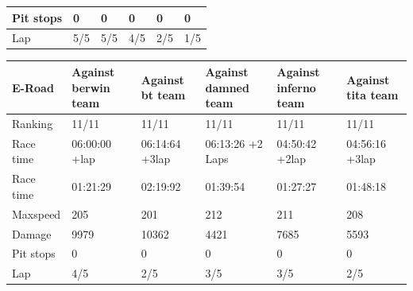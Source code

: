 \documentclass{llncs}
\begin{document}
\begin{table}[h!]
\begin{tabular}{ |p{3cm}|p{2cm}|p{2cm}|p{2 cm}|p{2 cm}|p{2 cm}|}
		
		Pit stops & 0 & 0 & 0 & 0& 0
		\\
		\hline 	
		Lap & 5/5  & 5/5 & 4/5 & 2/5 & 1/5
		\\ 
		\hline
	\end{tabular} 
	
	\begin{tabular}{ |p{3cm}|p{2cm}|p{2cm}|p{2 cm}|p{2 cm}|p{ 2 cm}|}
		\hline
		{ \color{blue}\textbf{E-Road} }&
		{ \color{red}\textbf{Against berwin team }}&  
		{ \color{red} \textbf{Against bt team} } &
		{ \color{red} \textbf{Against damned team} } &
		{ \color{red} \textbf{Against inferno team} }&
		{ \color{red} \textbf{Against tita team} }
		\\
		\hline
		Ranking  & 11/11 & 11/11 & 11/11 & 11/11 & 11/11
		\\
		\hline
		Race time & 06:00:00 +lap & 06:14:64 +3lap & 06:13:26 +2 Laps  &  04:50:42 +2lap  & 04:56:16 +3lap
		\\
		\hline
		Race time & 01:21:29  & 02:19:92 & 01:39:54 & 01:27:27   & 01:48:18
		\\
		\hline 
		Maxspeed & 205 & 201 & 212 & 211 & 208
		\\
		\hline
		
		Damage & 9979 & 10362 & 4421 & 7685 & 5593
		\\
		\hline 
		
		
		Pit stops & 0 & 0 & 0 & 0 & 0
		\\
		\hline 	
		Lap & 4/5 & 2/5 & 3/5 & 3/5 &  2/5
		\\
		\hline
	\end{tabular} 
\end{table} 
\newpage
\end{document}
